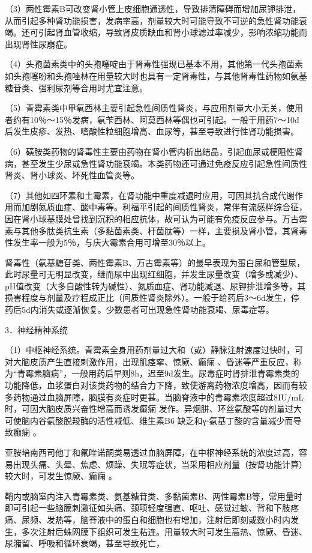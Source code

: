 （3）两性霉素B可改变肾小管上皮细胞通透性，导致排清障碍而增加尿钾排泄，从而引起多种肾功能损害，发病率高，剂量较大时可能导致不可逆的急性肾功能衰竭。还可引起肾血管收缩，导致肾皮质缺血和肾小球滤过率减少，影响浓缩功能而出现肾性尿崩症。

（4）头孢菌素类中的头孢噻啶由于肾毒性强现已基本不用，其他第一代头孢菌素如头孢噻吩和头孢唑林在用量较大时也具有一定肾毒性，与其他肾毒性药物如氨基糖苷类、强利尿剂等合用时尤宜注意。

（5）青霉素类中甲氧西林主要引起急性间质性肾炎，与应用剂量大小无关，使用者约有10％～15％发病，氨苄西林、阿莫西林等偶也可引起。一般于用药7～10d后发生皮疹、发热、嗜酸性粒细胞增高、血尿等，甚至导致进行性肾功能损害。

（6）磺胺类药物的肾毒性主要由药物在肾小管内析出结晶，引起血尿或梗阻性肾病，甚至发生少尿或急性肾功能衰竭。本类药物还可通过免疫反应引起急性间质性肾炎、肾小球炎、坏死性血管炎等。

（7）其他如四环素和土霉素，在肾功能中重度减退时应用，可因其抗合成代谢作用而加剧氮质血症、酸中毒等。利福平引起的间质性肾炎，常伴有流感样综合征，因在肾小球基膜处曾找到沉积的相应抗体，故可认为可能有免疫反应参与。万古霉素与其他多肽类抗生素（多黏菌素类、杆菌肽等）一样，主要损及肾小管，其肾毒性发生率一般为5％，与庆大霉素合用可增至30％以上。

肾毒性（氨基糖苷类、两性霉素B、万古霉素等）的最早表现为蛋白尿和管型尿，此时尿量可无明显改变，继而尿中出现红细胞，并发生尿量改变（增多或减少）、pH值改变（大多自酸性转为碱性）、氮质血症、肾功能减退、尿钾排泄增多等，其损害程度与剂量及疗程成正比（间质性肾炎除外）。一般于给药后3～6d发生，停药后5d内消失或逐渐恢复。少数患者可出现急性肾功能衰竭、尿毒症等。

3．神经精神系统

（1）中枢神经系统。青霉素全身用药剂量过大和（或）静脉注射速度过快时，可对大脑皮质产生直接刺激作用，出现肌痉挛、惊厥、癫痫
、昏迷等严重反应，称为“青霉素脑病”，一般用药后早则8h，迟至9d发生。尿毒症时肾排泄青霉素类的功能降低，血浆蛋白对该类药物的结合力下降，致使游离药物浓度增高，因而有较多药物通过血脑屏障，脑膜有炎症时更甚。当脑脊液中的青霉素浓度超过8IU/mL时，可因大脑皮质兴奋性增高而诱发癫痫
发作。异烟肼、环丝氨酸等的剂量过大可使脑内谷氨酸脱羧酶的活性减低、维生素B{6}
缺乏和γ-氨基丁酸的含量减少而导致癫痫
。

亚胺培南西司他丁和氟喹诺酮类易透过血脑屏障，在中枢神经系统的浓度过高，容易出现头痛、头晕、焦虑、烦躁、失眠等症状，当采用相应剂量（按肾功能计算）较大时，可发生惊厥、癫痫
。

鞘内或脑室内注入青霉素类、氨基糖苷类、多黏菌素B、两性霉素B等，常用量时即可引起一些脑膜刺激征如头痛、颈项轻度强直、呕吐、感觉过敏、背和下肢疼痛、尿频、发热等，脑脊液中的蛋白和细胞也有增加，注射后即刻或数小时内发生，多次注射后蛛网膜下组织可发生粘连。用量较大时可发生高热、惊厥、昏迷、尿潴留、呼吸和循环衰竭，甚至导致死亡，

